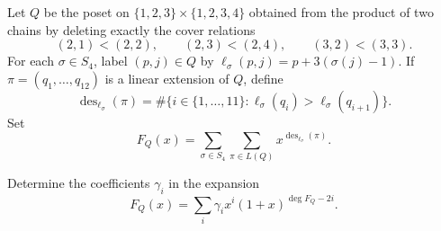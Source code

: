 Let \(Q\) be the poset on $\{1,2,3\}\times\{1,2,3,4\}$ obtained from the product of two chains by deleting exactly the cover relations
\[
(2,1)<(2,2),\qquad (2,3)<(2,4),\qquad (3,2)<(3,3).
\]
For each \(\sigma\in S_4\), label \((p,j)\in Q\) by $\ell_\sigma(p,j)=p+3(\sigma(j)-1)$. If \(\pi=(q_1,\dots,q_{12})\) is a linear extension of \(Q\), define
\[
\operatorname{des}_{\ell_\sigma}(\pi)
=
\#\{i\in\{1,\dots,11\}:\ell_\sigma(q_i)>\ell_\sigma(q_{i+1})\}.
\]
Set
\[
F_Q(x)
=
\sum_{\sigma\in S_4}\sum_{\pi\in L(Q)}
x^{\operatorname{des}_{\ell_\sigma}(\pi)}.
\]

Determine the coefficients \(\gamma_i\) in the expansion
\[
F_Q(x)=\sum_i \gamma_i x^i(1+x)^{\deg F_Q-2i}.
\]
